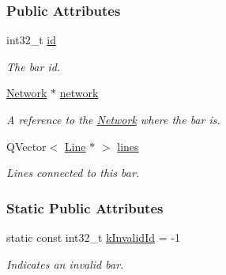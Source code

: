 \subsubsection*{Public Attributes}
\begin{DoxyCompactItemize}
\item 
int32\+\_\+t \hyperlink{class_bar_a9dc5c6a6d44fe412ae34ef8a881b8dce}{id}
\begin{DoxyCompactList}\small\item\em The bar id. \end{DoxyCompactList}\item 
\hyperlink{class_network}{Network} $\ast$ \hyperlink{class_bar_a80025f13884750add58cc61b318357ff}{network}
\begin{DoxyCompactList}\small\item\em A reference to the \hyperlink{class_network}{Network} where the bar is. \end{DoxyCompactList}\item 
Q\+Vector$<$ \hyperlink{class_line}{Line} $\ast$ $>$ \hyperlink{class_bar_a23b6d4319352ef0e77ad66aade4e0209}{lines}
\begin{DoxyCompactList}\small\item\em Lines connected to this bar. \end{DoxyCompactList}\end{DoxyCompactItemize}
\subsubsection*{Static Public Attributes}
\begin{DoxyCompactItemize}
\item 
static const int32\+\_\+t \hyperlink{group___models_ga9919592c0397ed41448dfb20b607d738}{k\+Invalid\+Id} = -\/1
\begin{DoxyCompactList}\small\item\em Indicates an invalid bar. \end{DoxyCompactList}\end{DoxyCompactItemize}

